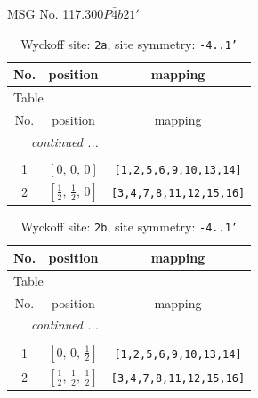 \documentclass[fleqn,8pt]{jsarticle}
\begin{document}
\setcounter{MaxMatrixCols}{32}

\renewcommand{\tablename}{Table~}
\renewcommand{\figurename}{Figure~}
\begin{center}
\LARGE
MSG No. 117.300\quad$P\bar{4}b21'$
\end{center}
\renewcommand{\arraystretch}{1.2}
\begin{longtable}{ccc}
\caption{Wyckoff site: {\tt 2a}, site symmetry: {\tt -4..1'}}
 \\
 \hline \hline
No. & position & mapping \\ \hline \endfirsthead

\multicolumn{2}{l}{\tablename\ \thetable{}} \\
 \hline \hline
No. & position & mapping \\ \hline \endhead

 \hline \hline
\multicolumn{2}{r}{\footnotesize\it continued ...} \\ \endfoot

 \hline \hline
\multicolumn{2}{r}{} \\ \endlastfoot

1 & $\left[ 0,\, 0,\, 0 \right]$ & {\tt [1,2,5,6,9,10,13,14]} \\ \hline
2 & $\left[ \frac{1}{2},\, \frac{1}{2},\, 0 \right]$ & {\tt [3,4,7,8,11,12,15,16]} \\
\end{longtable}
\renewcommand{\arraystretch}{1.2}
\begin{longtable}{ccc}
\caption{Wyckoff site: {\tt 2b}, site symmetry: {\tt -4..1'}}
 \\
 \hline \hline
No. & position & mapping \\ \hline \endfirsthead

\multicolumn{2}{l}{\tablename\ \thetable{}} \\
 \hline \hline
No. & position & mapping \\ \hline \endhead

 \hline \hline
\multicolumn{2}{r}{\footnotesize\it continued ...} \\ \endfoot

 \hline \hline
\multicolumn{2}{r}{} \\ \endlastfoot

1 & $\left[ 0,\, 0,\, \frac{1}{2} \right]$ & {\tt [1,2,5,6,9,10,13,14]} \\ \hline
2 & $\left[ \frac{1}{2},\, \frac{1}{2},\, \frac{1}{2} \right]$ & {\tt [3,4,7,8,11,12,15,16]} \\
\end{longtable}
\end{document}
